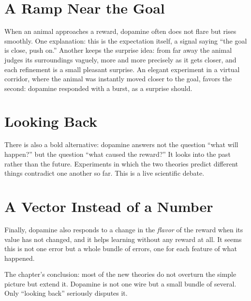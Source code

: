 \section*{A Ramp Near the Goal}

When an animal approaches a reward, dopamine often does not flare but rises smoothly. One explanation: this is the expectation itself, a signal saying ``the goal is close, push on.'' Another keeps the surprise idea: from far away the animal judges its surroundings vaguely, more and more precisely as it gets closer, and each refinement is a small pleasant surprise. An elegant experiment in a virtual corridor, where the animal was instantly moved closer to the goal, favors the second: dopamine responded with a burst, as a surprise should.

\section*{Looking Back}

There is also a bold alternative: dopamine answers not the question ``what will happen?'' but the question ``what caused the reward?'' It looks into the past rather than the future. Experiments in which the two theories predict different things contradict one another so far. This is a live scientific debate.

\section*{A Vector Instead of a Number}

Finally, dopamine also responds to a change in the \emph{flavor} of the reward when its value has not changed, and it helps learning without any reward at all. It seems this is not one error but a whole bundle of errors, one for each feature of what happened.

The chapter's conclusion: most of the new theories do not overturn the simple picture but extend it. Dopamine is not one wire but a small bundle of several. Only ``looking back'' seriously disputes it.

